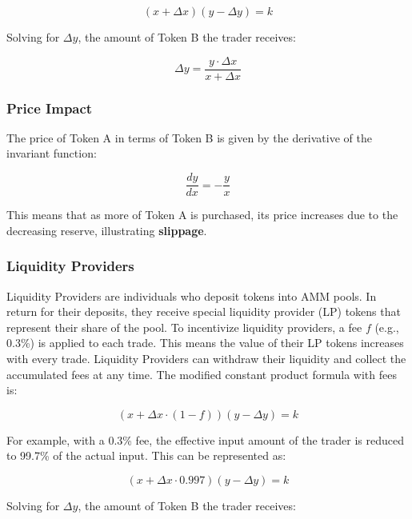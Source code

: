 \documentclass[12pt]{article}
\begin{document}
\begin{equation}
    (x + \Delta x) (y - \Delta y) = k
\end{equation}

Solving for \( \Delta y \), the amount of Token B the trader receives:

\begin{equation}
    \Delta y = \frac{y \cdot \Delta x}{x + \Delta x}
\end{equation}

\subsubsection*{Price Impact}
The price of Token A in terms of Token B is given by the derivative of the invariant function:

\begin{equation}
    \frac{dy}{dx} = -\frac{y}{x}
\end{equation}

This means that as more of Token A is purchased, its price increases due to the decreasing reserve, illustrating \textbf{slippage}.

\subsubsection*{Liquidity Providers}
Liquidity Providers are individuals who deposit tokens into AMM pools. In return for their deposits, they receive special liquidity provider (LP) tokens that represent their share of the pool. To incentivize liquidity providers, a fee \( f \) (e.g., 0.3\%) is applied to each trade. This means the value of their LP tokens increases with every trade. Liquidity Providers can withdraw their liquidity and collect the accumulated fees at any time. The modified constant product formula with fees is:

\begin{equation}
  (x + \Delta x \cdot (1 - f))(y - \Delta y) = k
\end{equation}

For example, with a 0.3\% fee, the effective input amount of the trader is reduced to 99.7\% of the actual input. This can be represented as:

\begin{equation}
  (x + \Delta x \cdot 0.997)(y - \Delta y) = k
\end{equation}

Solving for \( \Delta y \), the amount of Token B the trader receives:
\end{document}
